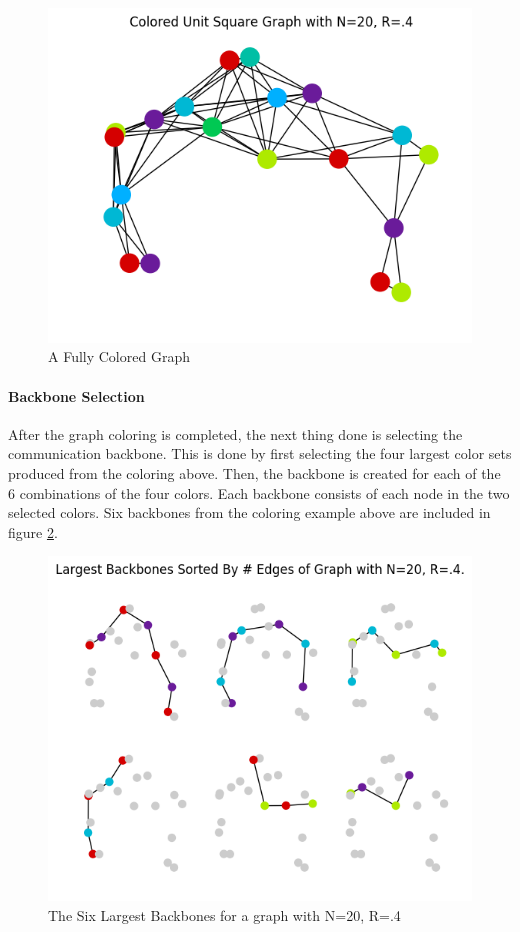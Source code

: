 \documentclass{article}
\begin{document}
    \begin{figure}
      \centering
      \label{colored_graph}
      \includegraphics[width=1 \textwidth]{walkthrough/final_colored}
      \caption{A Fully Colored Graph}
    \end{figure}

    \paragraph{Backbone Selection}
    After the graph coloring is completed, the next thing done is selecting the communication backbone.
    This is done by first selecting the four largest color sets produced from the coloring above.
    Then, the backbone is created for each of the 6 combinations of the four colors.
    Each backbone consists of each node in the two selected colors.
    Six backbones from the coloring example above are included in figure \ref{six_backbones}.

    \begin{figure}
      \centering
      \label{six_backbones}
      \includegraphics[width=1 \textwidth]{walkthrough/largest_backbones}
      \caption{The Six Largest Backbones for a graph with N=20, R=.4}
    \end{figure}
\end{document}

